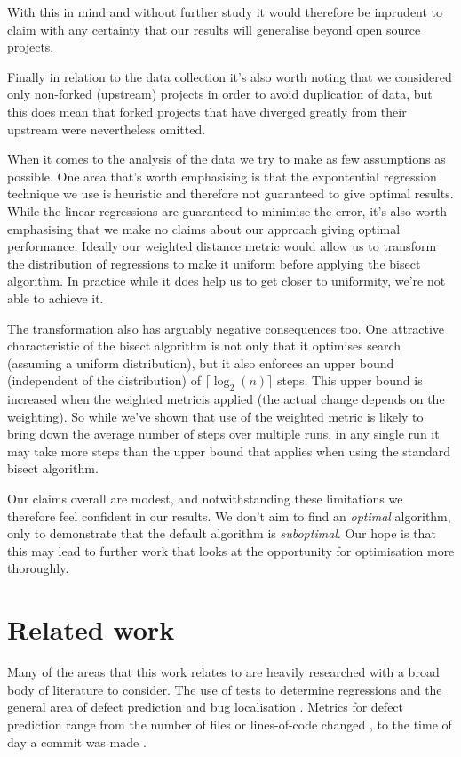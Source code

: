 \documentclass[10pt,journal,compsoc]{IEEEtran}
\begin{document}
With this in mind and without further study it would therefore be inprudent to claim with any certainty that our results will generalise beyond open source projects.

Finally in relation to the data collection it's also worth noting that we considered only non-forked (\ie upstream) projects in order to avoid duplication of data, but this does mean that forked projects that have diverged greatly from their upstream were nevertheless omitted.

When it comes to the analysis of the data we try to make as few assumptions as possible. One area that's worth emphasising is that the expontential regression technique we use is heuristic and therefore not guaranteed to give optimal results. While the linear regressions are guaranteed to minimise the error, it's also worth emphasising that we make no claims about our approach giving optimal performance. Ideally our weighted distance metric would allow us to transform the distribution of regressions to make it uniform before applying the bisect algorithm. In practice while it does help us to get closer to uniformity, we're not able to achieve it.

The transformation also has arguably negative consequences too. One attractive characteristic of the bisect algorithm is not only that it optimises search (assuming a uniform distribution), but it also enforces an upper bound (independent of the distribution) of $\lceil \log_2(n) \rceil$ steps. This upper bound is increased when the weighted metricis applied (the actual change depends on the weighting). So while we've shown that use of the weighted metric is likely to bring down the average number of steps over multiple runs, in any single run it may take more steps than the upper bound that applies when using the standard bisect algorithm.

Our claims overall are modest, and notwithstanding these limitations we therefore feel confident in our results. We don't aim to find an {\it optimal\/} algorithm, only to demonstrate that the default algorithm is {\it suboptimal}. Our hope is that this may lead to further work that looks at the opportunity for optimisation more thoroughly.

\section{Related work}

Many of the areas that this work relates to are heavily researched with a broad body of literature to consider. The use of tests to determine regressions \cite{} and the general area of defect prediction and bug localisation \cite{kamei2013, shimagaki2016, yan2019}. Metrics for defect prediction range from the number of files or lines-of-code changed \cite{moser2008}, to the time of day a commit was made \cite{eyolfson2011}.
\end{document}
